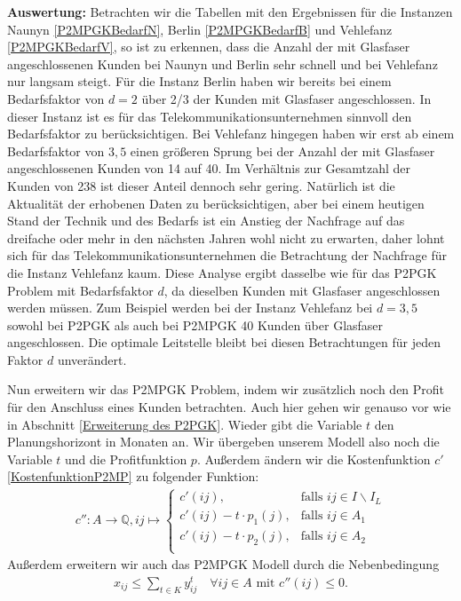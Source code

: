 \documentclass[11pt,a4paper]{article}
\newcommand{\Q}{\mathbb{Q}}
\theoremstyle{my_th_style1}
\begin{document}
 \textbf{Auswertung:} Betrachten wir die Tabellen mit den Ergebnissen f\"ur die Instanzen Naunyn \eqref{P2MPGKBedarfN}, Berlin \eqref{P2MPGKBedarfB} und Vehlefanz \eqref{P2MPGKBedarfV}, so ist zu erkennen, dass die Anzahl der mit Glasfaser angeschlossenen Kunden bei Naunyn und Berlin sehr schnell und bei Vehlefanz nur langsam steigt.
 F\"ur die Instanz Berlin haben wir bereits bei einem Bedarfsfaktor von \(d=2\) \"uber 2/3 der Kunden mit Glasfaser angeschlossen.
 In dieser Instanz ist es f\"ur das Telekommunikationsunternehmen sinnvoll den Bedarfsfaktor zu ber\"ucksichtigen.
Bei Vehlefanz hingegen haben wir erst ab einem Bedarfsfaktor von \(3,5\) einen gr\"oßeren Sprung bei der Anzahl der mit Glasfaser angeschlossenen Kunden von 14 auf 40.
Im Verh\"altnis zur Gesamtzahl der Kunden von 238 ist dieser Anteil dennoch sehr gering. 
Nat\"urlich ist die Aktualit\"at der erhobenen Daten zu ber\"ucksichtigen, aber bei einem heutigen Stand der Technik und des Bedarfs ist ein Anstieg der Nachfrage auf das dreifache oder mehr in den n\"achsten Jahren wohl nicht zu erwarten, daher lohnt sich f\"ur das Telekommunikationsunternehmen die Betrachtung der Nachfrage f\"ur die Instanz Vehlefanz kaum. 
Diese Analyse ergibt dasselbe wie für das P2PGK Problem mit Bedarfsfaktor $d$, da dieselben Kunden mit Glasfaser angeschlossen werden müssen.
Zum Beispiel werden bei der Instanz Vehlefanz bei $d=3,5$ sowohl bei P2PGK als auch bei P2MPGK 40 Kunden \"uber Glasfaser angeschlossen.
Die optimale Leitstelle bleibt bei diesen Betrachtungen für jeden Faktor $d$ unver\"andert. 
  
Nun erweitern wir das P2MPGK Problem, indem wir zusätzlich noch den Profit für den Anschluss eines Kunden betrachten.
Auch hier gehen wir genauso vor wie in Abschnitt \ref{Erweiterung des P2PGK}.
Wieder gibt die Variable $t$ den Planungshorizont in Monaten an.
Wir \"ubergeben unserem Modell also noch die Variable $t$ und die Profitfunktion $p$.
Außerdem \"andern wir die Kostenfunktion \(c'\) \eqref{KostenfunktionP2MP}  zu folgender Funktion:
\begin{align*}
  c'': A  \rightarrow \Q,  ij  \mapsto \left\{\begin{array}{cl} 
 c'(ij), & \text{falls } ij \in I\backslash I_L \\ 
  c'(ij) -t  \cdot p_1(j), & \text{falls } ij \in A_1 \\ 
    c'(ij) -t \cdot p_2(j), & \text{falls } ij \in  A_2 \\ 
\end{array}  \right.
\end{align*}
Außerdem erweitern wir auch das P2MPGK Modell durch die Nebenbedingung 
\begin{align*}
 x_{ij} \leq \displaystyle\sum_{t \in K} y_{ij}^t \quad \forall ij \in A \text{ mit } c''(ij) \leq 0.
\end{align*}
\end{document}
